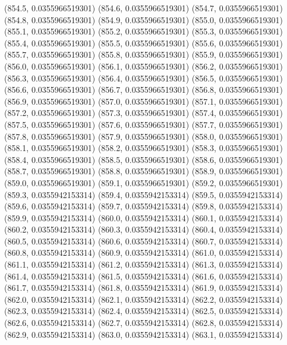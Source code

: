 {					(854.5, 0.0355966519301)
					(854.6, 0.0355966519301)
					(854.7, 0.0355966519301)
					(854.8, 0.0355966519301)
					(854.9, 0.0355966519301)
					(855.0, 0.0355966519301)
					(855.1, 0.0355966519301)
					(855.2, 0.0355966519301)
					(855.3, 0.0355966519301)
					(855.4, 0.0355966519301)
					(855.5, 0.0355966519301)
					(855.6, 0.0355966519301)
					(855.7, 0.0355966519301)
					(855.8, 0.0355966519301)
					(855.9, 0.0355966519301)
					(856.0, 0.0355966519301)
					(856.1, 0.0355966519301)
					(856.2, 0.0355966519301)
					(856.3, 0.0355966519301)
					(856.4, 0.0355966519301)
					(856.5, 0.0355966519301)
					(856.6, 0.0355966519301)
					(856.7, 0.0355966519301)
					(856.8, 0.0355966519301)
					(856.9, 0.0355966519301)
					(857.0, 0.0355966519301)
					(857.1, 0.0355966519301)
					(857.2, 0.0355966519301)
					(857.3, 0.0355966519301)
					(857.4, 0.0355966519301)
					(857.5, 0.0355966519301)
					(857.6, 0.0355966519301)
					(857.7, 0.0355966519301)
					(857.8, 0.0355966519301)
					(857.9, 0.0355966519301)
					(858.0, 0.0355966519301)
					(858.1, 0.0355966519301)
					(858.2, 0.0355966519301)
					(858.3, 0.0355966519301)
					(858.4, 0.0355966519301)
					(858.5, 0.0355966519301)
					(858.6, 0.0355966519301)
					(858.7, 0.0355966519301)
					(858.8, 0.0355966519301)
					(858.9, 0.0355966519301)
					(859.0, 0.0355966519301)
					(859.1, 0.0355966519301)
					(859.2, 0.0355966519301)
					(859.3, 0.0355942153314)
					(859.4, 0.0355942153314)
					(859.5, 0.0355942153314)
					(859.6, 0.0355942153314)
					(859.7, 0.0355942153314)
					(859.8, 0.0355942153314)
					(859.9, 0.0355942153314)
					(860.0, 0.0355942153314)
					(860.1, 0.0355942153314)
					(860.2, 0.0355942153314)
					(860.3, 0.0355942153314)
					(860.4, 0.0355942153314)
					(860.5, 0.0355942153314)
					(860.6, 0.0355942153314)
					(860.7, 0.0355942153314)
					(860.8, 0.0355942153314)
					(860.9, 0.0355942153314)
					(861.0, 0.0355942153314)
					(861.1, 0.0355942153314)
					(861.2, 0.0355942153314)
					(861.3, 0.0355942153314)
					(861.4, 0.0355942153314)
					(861.5, 0.0355942153314)
					(861.6, 0.0355942153314)
					(861.7, 0.0355942153314)
					(861.8, 0.0355942153314)
					(861.9, 0.0355942153314)
					(862.0, 0.0355942153314)
					(862.1, 0.0355942153314)
					(862.2, 0.0355942153314)
					(862.3, 0.0355942153314)
					(862.4, 0.0355942153314)
					(862.5, 0.0355942153314)
					(862.6, 0.0355942153314)
					(862.7, 0.0355942153314)
					(862.8, 0.0355942153314)
					(862.9, 0.0355942153314)
					(863.0, 0.0355942153314)
					(863.1, 0.0355942153314)
}
